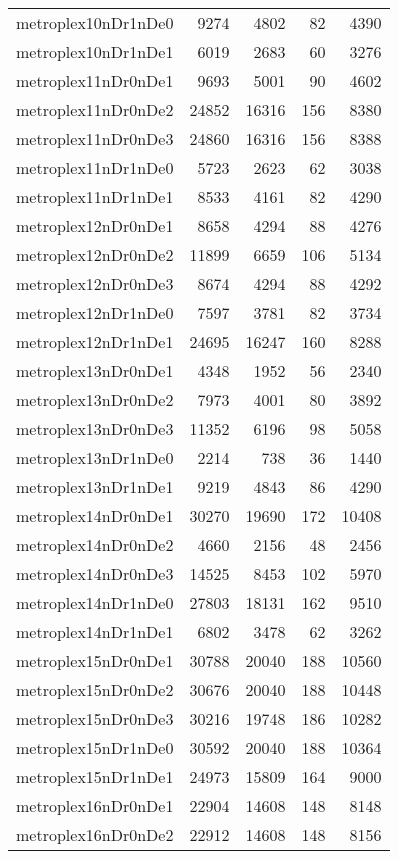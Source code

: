 \begin{longtable}{lrrrr}
metroplex10nDr1nDe0 & 9274 & 4802 & 82 & 4390 \\
metroplex10nDr1nDe1 & 6019 & 2683 & 60 & 3276 \\
metroplex11nDr0nDe1 & 9693 & 5001 & 90 & 4602 \\
metroplex11nDr0nDe2 & 24852 & 16316 & 156 & 8380 \\
metroplex11nDr0nDe3 & 24860 & 16316 & 156 & 8388 \\
metroplex11nDr1nDe0 & 5723 & 2623 & 62 & 3038 \\
metroplex11nDr1nDe1 & 8533 & 4161 & 82 & 4290 \\
metroplex12nDr0nDe1 & 8658 & 4294 & 88 & 4276 \\
metroplex12nDr0nDe2 & 11899 & 6659 & 106 & 5134 \\
metroplex12nDr0nDe3 & 8674 & 4294 & 88 & 4292 \\
metroplex12nDr1nDe0 & 7597 & 3781 & 82 & 3734 \\
metroplex12nDr1nDe1 & 24695 & 16247 & 160 & 8288 \\
metroplex13nDr0nDe1 & 4348 & 1952 & 56 & 2340 \\
metroplex13nDr0nDe2 & 7973 & 4001 & 80 & 3892 \\
metroplex13nDr0nDe3 & 11352 & 6196 & 98 & 5058 \\
metroplex13nDr1nDe0 & 2214 & 738 & 36 & 1440 \\
metroplex13nDr1nDe1 & 9219 & 4843 & 86 & 4290 \\
metroplex14nDr0nDe1 & 30270 & 19690 & 172 & 10408 \\
metroplex14nDr0nDe2 & 4660 & 2156 & 48 & 2456 \\
metroplex14nDr0nDe3 & 14525 & 8453 & 102 & 5970 \\
metroplex14nDr1nDe0 & 27803 & 18131 & 162 & 9510 \\
metroplex14nDr1nDe1 & 6802 & 3478 & 62 & 3262 \\
metroplex15nDr0nDe1 & 30788 & 20040 & 188 & 10560 \\
metroplex15nDr0nDe2 & 30676 & 20040 & 188 & 10448 \\
metroplex15nDr0nDe3 & 30216 & 19748 & 186 & 10282 \\
metroplex15nDr1nDe0 & 30592 & 20040 & 188 & 10364 \\
metroplex15nDr1nDe1 & 24973 & 15809 & 164 & 9000 \\
metroplex16nDr0nDe1 & 22904 & 14608 & 148 & 8148 \\
metroplex16nDr0nDe2 & 22912 & 14608 & 148 & 8156 \\

\end{longtable}
